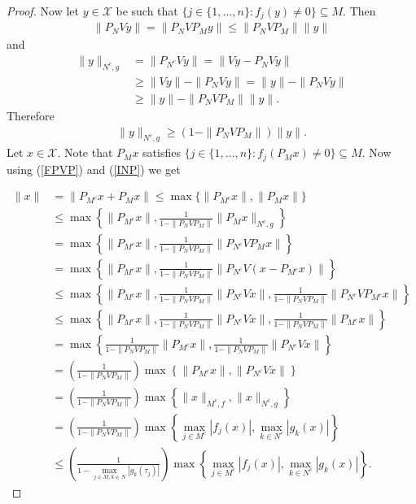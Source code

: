 \documentclass[10pt,a4paper]{amsart}
\begin{document}
\begin{proof}
Now let $y \in \mathcal{X}$ be such that $\{j \in \{1, \dots, n\}: f_j(y)\neq 0\} \subseteq M.$
Then 
\begin{align*}
	\|P_NVy\|=\|P_NVP_My\|\leq \|P_NVP_M\|\|y\|
\end{align*}
 and 
\begin{align*}
	\|y\|_{N^c, g}&=\|P_{N^c}Vy\|=\|Vy-P_NVy\|\\
	&\geq \|Vy\|-\|P_NVy\|=\|y\|-\|P_NVy\| \\
	&\geq \|y\|-\|P_NVP_M\|\|y\|.
\end{align*}
Therefore 
\begin{align}\label{INP}
	\|y\|_{N^c, g}\geq (1-\|P_NVP_M\|)\|y\|.
\end{align}
Let $x \in \mathcal{X}$.   Note that $P_Mx$ satisfies $	\{j \in \{1, \dots, n\}: f_j(P_Mx)\neq 0\} \subseteq M.$ Now using (\ref{FPVP}) and (\ref{INP}) we get 

\begin{align*}
	\|x\|&=\|P_{M^c}x+P_Mx\|\leq \max\{\|P_{M^c}x\|, \|P_Mx\|\}\\
	&\leq \max \left\{\|P_{M^c}x\|, \frac{1}{1-\|P_NVP_M\|}	\|P_Mx\|_{N^c, g}\right\} \\
	&= \max \left\{\|P_{M^c}x\|, \frac{1}{1-\|P_NVP_M\|}	\|P_{N^c}VP_Mx\|\right\} \\
	&=\max \left\{\|P_{M^c}x\|, \frac{1}{1-\|P_NVP_M\|}	\|P_{N^c}V(x-P_{M^c}x)\|\right\} \\
	&\leq \max \left\{\|P_{M^c}x\|, \frac{1}{1-\|P_NVP_M\|}	\|P_{N^c}Vx\|, \frac{1}{1-\|P_NVP_M\|}	\|P_{N^c}VP_{M^c}x\|\right\} \\
	&\leq \max \left\{\|P_{M^c}x\|, \frac{1}{1-\|P_NVP_M\|}	\|P_{N^c}Vx\|, \frac{1}{1-\|P_NVP_M\|}	\|P_{M^c}x\|\right\} \\
	&=\max \left\{\frac{1}{1-\|P_NVP_M\|}	\|P_{M^c}x\|, \frac{1}{1-\|P_NVP_M\|}	\|P_{N^c}Vx\|\right\} \\
	&=\left(\frac{1}{1-\|P_NVP_M\|}\right)\max \left\{\|P_{M^c}x\|, \|P_{N^c}Vx\|\right\} \\
	&=\left(\frac{1}{1-\|P_NVP_M\|}\right)\max \left\{\|x\|_{M^c, f}, \|x\|_{N^c, g}\right\} \\
	&= \left(\frac{1}{1-\|P_NVP_M\|}\right)\max\left\{\displaystyle \max_{j \in M^c}|f_j(x)|, \displaystyle \max_{k \in N^c}|g_k(x)|\right\}\\
	&\leq  \left(\frac{1}{1-\displaystyle \max_{j \in M, k \in N}|g_k(\tau_j)|}\right)\max\left\{\displaystyle \max_{j \in M^c}|f_j(x) |, \displaystyle \max_{k \in N^c}|g_k(x)|\right\}.
\end{align*}
\end{proof}
\end{document}
